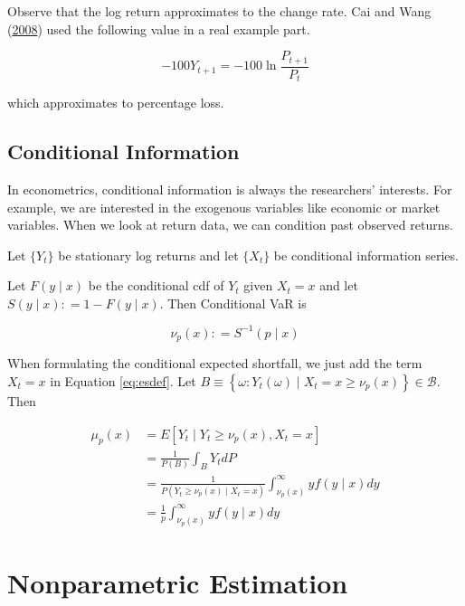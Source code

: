 \documentclass[
]{article}
\theoremstyle{definition}
\theoremstyle{definition}
\theoremstyle{definition}
\theoremstyle{remark}
\let\BeginKnitrBlock\begin \let\EndKnitrBlock\end
\begin{document}
Observe that the log return approximates to the change rate. Cai and Wang (\protect\hyperlink{ref-cai:2008aa}{2008}) used the following value in a real example part.

\[-100 Y_{t + 1} = -100 \ln \frac{P_{t + 1}}{P_t}\]

which approximates to percentage loss.

\hypertarget{conditional-information}{%
\subsection{Conditional Information}\label{conditional-information}}

In econometrics, conditional information is always the researchers' interests. For example, we are interested in the exogenous variables like economic or market variables. When we look at return data, we can condition past observed returns.

Let \(\{ Y_t \}\) be stationary log returns and let \(\{ X_t \}\) be conditional information series.

\BeginKnitrBlock{definition}[Conditional Value-at-Risk]
\protect\hypertarget{def:condvar}{}{\label{def:condvar} {} }Let \(F(y \mid x)\) be the conditional cdf of \(Y_t\) given \(X_t = x\) and let \(S(y \mid x) \mathpunct{:}=1 - F(y \mid x)\). Then Conditional VaR is

\[\nu_p(x) \mathpunct{:}=S^{-1}(p \mid x)\]
\EndKnitrBlock{definition}

When formulating the conditional expected shortfall, we just add the term \(X_t = x\) in Equation \eqref{eq:esdef}. Let \(B \equiv \left\{ \omega \mathpunct{:} Y_t(\omega) \mid X_t = x \ge \nu_p(x) \right\} \in \mathcal{B}\). Then

\begin{equation}
  \begin{split}
    \mu_p(x) & = E \left[ Y_t \mid Y_t \ge \nu_p(x), X_t = x \right] \\
    & = \frac{1}{P(B)} \int_{B} Y_t dP \\
    & = \frac{1}{P\left( Y_t \ge \nu_p(x) \mid X_t = x \right)} \int_{\nu_p(x)}^\infty y f(y \mid x) dy \\
    & = \frac{1}{p} \int_{\nu_p(x)}^\infty y f(y \mid x) dy
  \end{split}
  \label{eq:cesformul}
\end{equation}

\hypertarget{nonparam}{%
\section{Nonparametric Estimation}\label{nonparam}}
\end{document}
